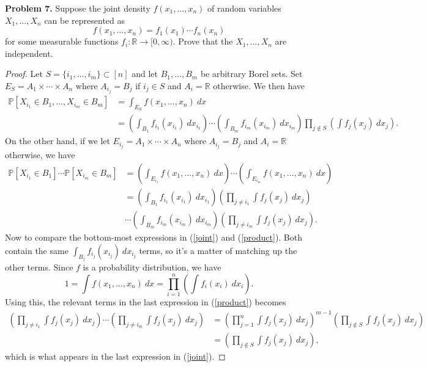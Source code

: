 \documentclass[11pt,letterpaper]{report}
\newcommand{\reals}{\mathbb{R}}
\newcommand{\Prob}{\mathbb{P}}
\begin{document}
\noindent\textbf{Problem 7. }
Suppose the joint density $f(x_1, \ldots, x_n)$ of random variables $X_1, \ldots, X_n$ can be represented as
\[
f(x_1, \ldots, x_n) = f_1(x_1)\cdots f_n(x_n)
\]
for some measurable functions $f_i:\reals\to [0, \infty)$. Prove that the $X_1, \ldots, X_n$ are independent.
\begin{proof}
	Let $S = \{i_1, \ldots, i_m\}\subset [n]$ and let $B_1, \ldots, B_m$ be arbitrary Borel sets. Set $E_S = A_1\times \cdots \times A_n$ where $A_{i_j} = B_j$ if $i_j\in S$ and $A_i = \reals$ otherwise. We then have
	\begin{equation}\label{joint}
	\begin{split}
		\Prob[X_{i_1}\in B_1, \ldots, X_{i_m}\in B_m] &= \int_{E_S} f(x_1, \ldots, x_n)\ dx\\
		&= \left(\int_{B_1}f_{i_1}(x_{i_1})\ dx_{i_1}\right)\cdots\left(\int_{B_m}f_{i_m}(x_{i_m})\ dx_{i_m}\right) \prod_{j\notin S}\left(\int f_j(x_j)\ dx_j\right).
	\end{split}
	\end{equation}
	On the other hand, if we let $E_{i_j} = A_1\times \cdots \times A_n$ where $A_{i_j} = B_j$ and $A_i = \reals$ otherwise, we have
	\begin{equation}\label{product}
	\begin{split}
		\Prob[X_{i_1}\in B_1] \cdots \Prob[X_{i_m}\in B_m] &= \left(\int_{E_{i_1}}f(x_1, \ldots, x_n)\ dx\right)\cdots \left(\int_{E_{i_m}}f(x_1, \ldots, x_n)\ dx\right)\\
		&= \left(\int_{B_1}f_{i_1}(x_{i_1})\ dx_{i_1}\right)\left(\prod_{j\neq i_1}\int f_j(x_j)\ dx_j\right)\\
		&\cdots \left(\int_{B_m}f_{i_m}(x_{i_m})\ dx_{i_m}\right)\left(\prod_{j\neq i_m}\int f_j(x_j)\ dx_j\right).
	\end{split}
	\end{equation}
	Now to compare the bottom-most expressions in (\ref{joint}) and (\ref{product}). Both contain the same $\int_{B_j}f_{i_j}(x_{i_j})\ dx_{i_j}$ terms, so it's a matter of matching up the other terms. Since $f$ is a probability distribution, we have
	\[
	1 = \int f(x_1, \ldots, x_n)\ dx = \prod_{i=1}^n\left(\int f_i(x_i)\ dx_i\right).
	\]
	Using this, the relevant terms in the last expression in (\ref{product}) becomes
	\begin{align*}
		\left(\prod_{j\neq i_1}\int f_j(x_j)\ dx_j\right)\cdots \left(\prod_{j\neq i_m}\int f_j(x_j)\ dx_j\right) &= \left(\prod_{j=1}^n\int f_j(x_j)\ dx_j\right)^{m-1}\left(\prod_{j\notin S}\int f_j(x_j)\ dx_j\right)\\
		&= \left(\prod_{j\notin S}\int f_j(x_j)\ dx_j\right),
	\end{align*}
	which is what appears in the last expression in (\ref{joint}).
\end{proof}
\end{document}
